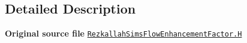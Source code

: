 \subsection{Detailed Description}
{\bfseries Original source file} \href{../../../home/carlo/data/GeN-Foam/GeN-Foam_ffn/GeN-Foam/GeN-Foam/classes/thermalHydraulics/src/physicsModels/heatTransferModels/FSHeatTransferCoefficientModels/subModels/flowEnhancementFactorModels/RezkallahSims/RezkallahSimsFlowEnhancementFactor.H}{\tt Rezkallah\+Sims\+Flow\+Enhancement\+Factor.\+H} 